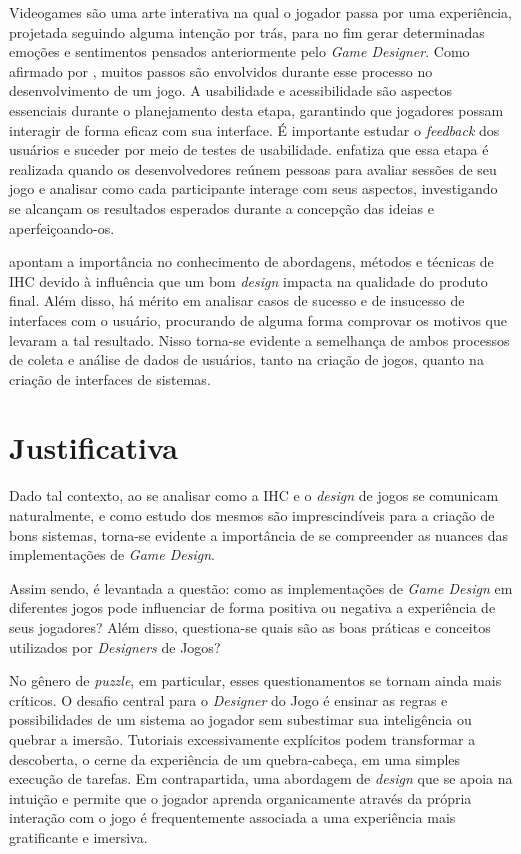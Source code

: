 Videogames são uma arte interativa na qual o jogador passa por uma experiência, projetada seguindo alguma intenção por trás, para no fim gerar determinadas emoções e sentimentos pensados anteriormente pelo \textit{Game Designer}. Como afirmado por , muitos passos são envolvidos durante esse processo no desenvolvimento de um jogo. A usabilidade e acessibilidade são aspectos essenciais durante o planejamento desta etapa, garantindo que jogadores possam interagir de forma eficaz com sua interface. É importante estudar o \textit{feedback} dos usuários e suceder por meio de testes de usabilidade.  enfatiza que essa etapa é realizada quando os desenvolvedores reúnem pessoas para avaliar sessões de seu jogo e analisar como cada participante interage com seus aspectos, investigando se alcançam os resultados esperados durante a concepção das ideias e aperfeiçoando-os.

 apontam a importância no conhecimento de abordagens, métodos e técnicas de IHC devido à influência que um bom \textit{design} impacta na qualidade do produto final. Além disso, há mérito em analisar casos de sucesso e de insucesso de interfaces com o usuário, procurando de alguma forma comprovar os motivos que levaram a tal resultado. Nisso torna-se evidente a semelhança de ambos processos de coleta e análise de dados de usuários, tanto na criação de jogos, quanto na criação de interfaces de sistemas.

\section{Justificativa}

Dado tal contexto, ao se analisar como a IHC e o \textit{design} de jogos se comunicam naturalmente, e como estudo dos mesmos são imprescindíveis para a criação de bons sistemas, torna-se evidente a importância de se compreender as nuances das implementações de \textit{Game Design}.	

Assim sendo, é levantada a questão: como as implementações de \textit{Game Design} em diferentes jogos pode influenciar de forma positiva ou negativa a experiência de seus jogadores? Além disso, questiona-se quais são as boas práticas e conceitos utilizados por \textit{Designers} de Jogos?

No gênero de \textit{puzzle}, em particular, esses questionamentos se tornam ainda mais críticos. O desafio central para o \textit{Designer} do Jogo é ensinar as regras e possibilidades de um sistema ao jogador sem subestimar sua inteligência ou quebrar a imersão. Tutoriais excessivamente explícitos podem transformar a descoberta, o cerne da experiência de um quebra-cabeça, em uma simples execução de tarefas. Em contrapartida, uma abordagem de \textit{design} que se apoia na intuição e permite que o jogador aprenda organicamente através da própria interação com o jogo é frequentemente associada a uma experiência mais gratificante e imersiva.


